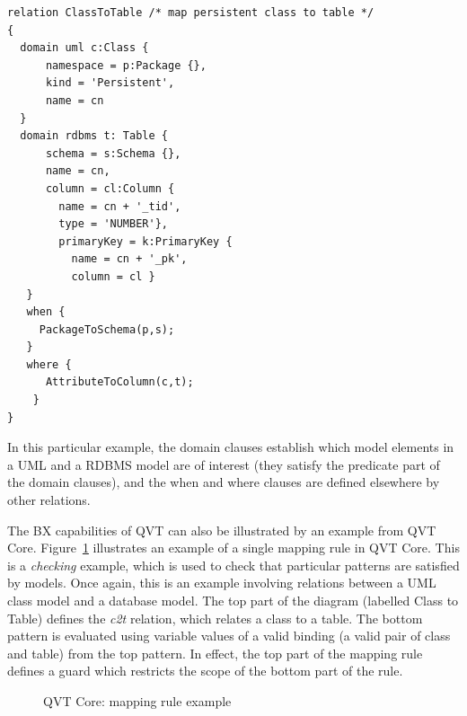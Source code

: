 \begin{lstlisting}[float,floatplacement=H,basicstyle=\ttfamily,caption=An example of QVT Relations,captionpos=b,label=listing:qvt-relations]
relation ClassToTable /* map persistent class to table */
{
  domain uml c:Class {
      namespace = p:Package {},
      kind = 'Persistent',
      name = cn
  }
  domain rdbms t: Table {
      schema = s:Schema {},
      name = cn,
      column = cl:Column {
        name = cn + '_tid',
        type = 'NUMBER'},
        primaryKey = k:PrimaryKey {
          name = cn + '_pk',
          column = cl }
   }
   when { 
     PackageToSchema(p,s);
   }
   where {
      AttributeToColumn(c,t);
    }
}
\end{lstlisting}
In this particular example, the domain clauses establish which model elements in a UML and a RDBMS model are of interest (they satisfy the predicate part of the domain clauses), and the when and where clauses are defined elsewhere by other relations.

The BX capabilities of QVT can also be illustrated by an example from QVT Core. Figure~\ref{fig:qvt-core} illustrates an example of a single mapping rule in QVT Core. This is a \textit{checking} example, which is used to check that particular patterns are satisfied by models. Once again, this is an example involving relations between a UML class model and a database model. The top part of the diagram (labelled Class to Table) defines the \textit{c2t} relation, which relates a class to a table. The bottom pattern is evaluated using variable values of a valid binding (a valid pair of class and table) from the top pattern. In effect, the top part of the mapping rule defines a guard which restricts the scope of the bottom part of the rule.

\begin{figure}[htbp]
\caption{QVT Core: mapping rule example}
\label{fig:qvt-core}
\end{figure}

